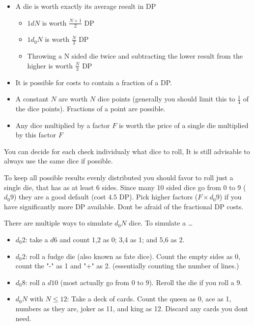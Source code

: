\documentclass[11pt]{article}
\begin{document}
{\begin{short}
\begin{itemize}
\item A die is worth exactly its average result in DP
\begin{itemize}
\item \(1 d N\) is worth \(\frac{N+1}{2}\) DP
\item \(1 d_0 N\) is worth \(\frac{N}{2}\) DP
\item Throwing a N sided die twice and subtracting the lower result from the higher is worth \(\frac{N}{3}\) DP
\end{itemize}
\item It is possible for costs to contain a fraction of a DP.
\item A constant \(N\) are worth \(N\) dice points (generally you should limit this to \(\frac{1}{4}\) of the dice points). Fractions of a point are possible.
\item Any dice multiplied by a factor \(F\) is worth the price of a single die multiplied by this factor \(F\)
\end{itemize}

You can decide for each check individualy what dice to roll, It is still advisable to always use the same dice if possible. 
\end{short}

To keep all possible results evenly distributed you should favor to roll just a single die, that has as at least 6 sides. Since many 10 sided dice go from 0 to 9 (\(d_0 9\)) they are a good default (cost \(4.5\) DP). Pick higher factors (\(F \times d_0 9\)) if you have significantly more DP available. Dont be afraid of the fractional DP costs. 

There are multiple ways to simulate \(d_0 N\) dice. To simulate a \ldots{}
\begin{itemize}
\item \(d_0 2\): take a \(d6\) and count 1,2 as 0; 3,4 as 1; and 5,6 as 2.
\item \(d_0 2\): roll a fudge die (also known as fate dice). Count the empty sides as 0, count the "-" as 1 and "+" as 2. (essentially counting the number of lines.)
\item \(d_0 8\): roll a \(d10\) (most actually go from 0 to 9). Reroll the die if you roll a 9.
\item \(d_0 N\) with \(N \le 12\): Take a deck of cards. Count the queen as 0, ace as 1, numbers as they are, joker as 11, and king as 12. Discard any cards you dont need.
\end{itemize}

}
\end{document}
